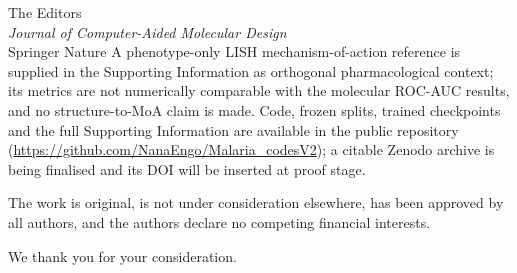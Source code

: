 \documentclass[11pt,a4paper]{letter}
\begin{document}
\begin{letter}{%
  The Editors \\
  \textit{Journal of Computer-Aided Molecular Design} \\
  Springer Nature
}
A phenotype-only LISH mechanism-of-action reference is supplied in the Supporting Information as orthogonal pharmacological context; its metrics are not numerically comparable with the molecular ROC-AUC results, and no structure-to-MoA claim is made. Code, frozen splits, trained checkpoints and the full Supporting Information are available in the public repository (\url{https://github.com/NanaEngo/Malaria_codesV2}); a citable Zenodo archive is being finalised and its DOI will be inserted at proof stage.

The work is original, is not under consideration elsewhere, has been approved by all authors, and the authors declare no competing financial interests.

\closing{We thank you for your consideration.}

\end{letter}
\end{document}
